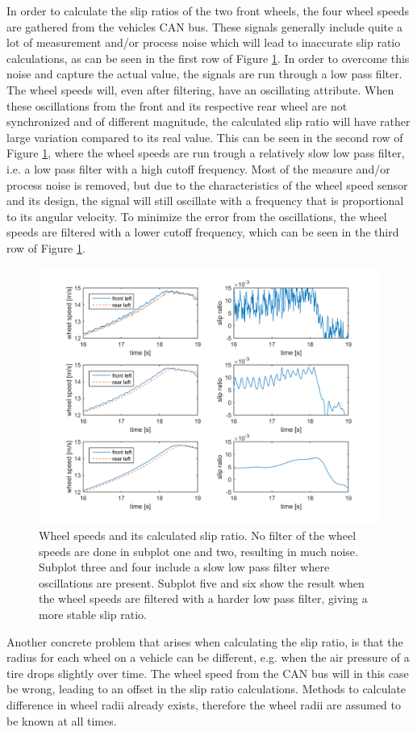 In order to calculate the slip ratios of the two front wheels, the four wheel speeds are gathered from the vehicles CAN bus. These signals generally include quite a lot of measurement and/or process noise which will lead to inaccurate slip ratio calculations, as can be seen in the first row of Figure \ref{wheel_speed_and_slip}. In order to overcome this noise and capture the actual value, the signals are run through a low pass filter. The wheel speeds will, even after filtering, have an oscillating attribute. When these oscillations from the front and its respective rear wheel are not synchronized and of different magnitude, the calculated slip ratio will have rather large variation compared to its real value. This can be seen in the second row of Figure \ref{wheel_speed_and_slip}, where the wheel speeds are run trough a relatively slow low pass filter, i.e. a low pass filter with a high cutoff frequency. Most of the measure and/or process noise is removed, but due to the characteristics of the wheel speed sensor and its design, the signal will still oscillate with a frequency that is proportional to its angular velocity. To minimize the error from the oscillations, the wheel speeds are filtered with a lower cutoff frequency, which can be seen in the third row of Figure \ref{wheel_speed_and_slip}. 
\begin{figure}[h]
	\centering
	\includegraphics[width=1.0\textwidth]{Pictures/wheel_speed_and_slip}
	\caption {Wheel speeds and its calculated slip ratio. No filter of the wheel speeds are done in subplot one and two, resulting in much noise. Subplot three and four include a slow low pass filter where oscillations are present. Subplot five and six show the result when the wheel speeds are filtered with a harder low pass filter, giving a more stable slip ratio.}
	\label{wheel_speed_and_slip}
\end{figure}
Another concrete problem that arises when calculating the slip ratio, is that the radius for each wheel on a vehicle can be different, e.g. when the air pressure of a tire drops slightly over time. The wheel speed from the CAN bus will in this case be wrong, leading to an offset in the slip ratio calculations. Methods to calculate difference in wheel radii already exists, therefore the wheel radii are assumed to be known at all times.

